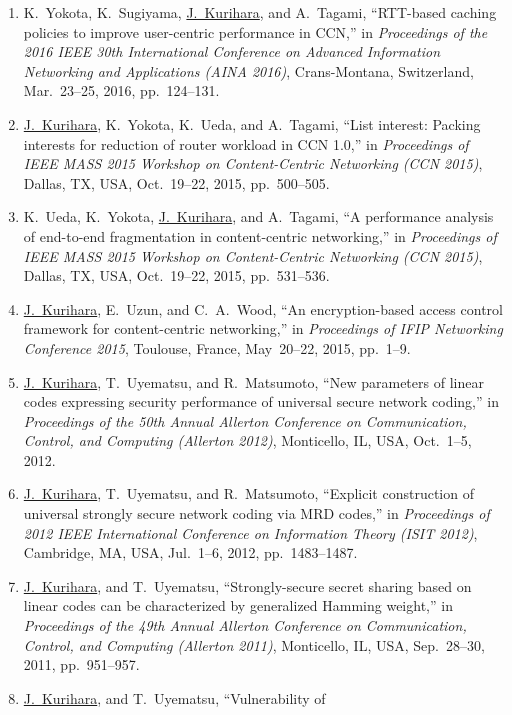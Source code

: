 \begin{enumerate}
 \item K.~Yokota, K.~Sugiyama, \underline{J.~Kurihara}, and A.~Tagami, ``RTT-based caching policies to improve user-centric performance in CCN,'' in \textit{Proceedings of the 2016 IEEE 30th International Conference on Advanced Information Networking and Applications (AINA 2016)}, Crans-Montana, Switzerland, Mar.~23--25, 2016, pp.~124--131.
 \item \underline{J.~Kurihara}, K.~Yokota, K.~Ueda, and A.~Tagami, ``List interest: Packing interests for reduction of router workload in CCN 1.0,'' in \textit{Proceedings of IEEE MASS 2015 Workshop on Content-Centric Networking (CCN 2015)}, Dallas, TX, USA, Oct.~19--22, 2015, pp.~500--505.
 \item K.~Ueda, K.~Yokota, \underline{J.~Kurihara}, and A.~Tagami, ``A performance analysis of end-to-end fragmentation in content-centric networking,'' in \textit{Proceedings of IEEE MASS 2015 Workshop on Content-Centric Networking (CCN 2015)}, Dallas, TX, USA, Oct.~19--22, 2015, pp.~531--536.
 \item \underline{J.~Kurihara}, E.~Uzun, and C.~A.~Wood, ``An encryption-based access control framework for content-centric networking,'' in \textit{Proceedings of IFIP Networking Conference 2015}, Toulouse, France, May~20--22, 2015, pp.~1--9.
 \item \underline{J.~Kurihara}, T.~Uyematsu, and R.~Matsumoto, ``New
       parameters of linear codes expressing security performance of
       universal secure network coding,''
       in \textit{Proceedings of the 50th Annual Allerton
       Conference on Communication, Control, and Computing (Allerton
       2012)}, Monticello, IL, USA, Oct.~1--5, 2012.
 \item \underline{J.~Kurihara}, T.~Uyematsu, and R.~Matsumoto,
       ``Explicit construction of universal strongly secure network
       coding via MRD codes,''
       in \textit{Proceedings of 2012 IEEE International Conference on
       Information Theory (ISIT 2012)}, Cambridge, MA, USA, Jul.~1--6,
       2012, pp.~1483--1487.
 \item \underline{J.~Kurihara}, and T.~Uyematsu, ``Strongly-secure secret
       sharing based on linear codes can be characterized by generalized
       Hamming weight,'' in \textit{Proceedings of the 49th Annual Allerton
       Conference on Communication, Control, and Computing (Allerton
       2011)}, Monticello, IL, USA, Sep.~28--30, 2011, pp.~951--957.
 \item \underline{J.~Kurihara}, and T.~Uyematsu, ``Vulnerability of

\end{enumerate}
